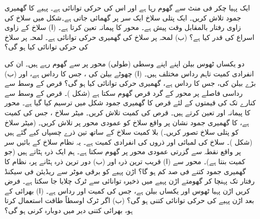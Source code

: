 ایک پہیا   چکر فی منٹ سے گھوم رہا ہے  اور اس  کی  حرکی توانائی   ہے۔ پہیے کا گھمیری جمود تلاش کریں۔
ایک پتلی سلاخ  ایک سر پر گھمائی جاتی ہے۔شکل  میں سلاخ کی   زاوی رفتار بالمقابل وقت پیش ہے۔ محور  کا پیمانہ  تعین کرتا ہے۔ (ا)  سلاخ کے  زاوی  اسراع کی قدر کیا ہے؟ (ب)  لمحہ  پر سلاخ کی گھمیری  حرکی  توانائی  ہے۔ لمحہ  پر سلاخ کی حرکی توانائی کیا ہو گی؟

دو یکساں ٹھوس  بیلن  اپنے اپنے وسطی (طولی)  محور پر     سے گھوم رہے  ہیں۔ ان کی انفرادی  کمیت    تاہم رداس مختلف ہیں۔ (ا) چھوٹے بیلن کی ، جس کا رداس  ہے، اور (ب) بڑے بیلن کی، جس کا رداس  ہے، گھمیری حرکی توانائی کیا ہو گی؟
 قرص  کے وسط سے  رداسی  فاصلے پر  محور کے گرد قرص گھوم سکتا ہے (شکل )۔  قرص کے وسط سے کنارے تک  کی قیمتوں کے لئے قرص کا گھمیری جمود   شکل  میں ترسیم کیا گیا ہے۔ محور  کا پیمانہ  اور  تعین کرتے ہیں۔ قرص کی کمیت تلاش کریں۔
میٹر سلاخ ،   جس کی کمیت  ہے، کا  گھمیری جمود   نشان پر واقع  سلاخ کو عمودی محور پر تلاش کریں۔ (میٹر سلاخ کو پتلی  سلاخ تصور کریں۔)
بلا کمیت سلاخ کے ساتھ تین ذرے چسپاں کیے گئے ہیں (شکل )۔ سلاخ کی لمبائی  اور ذروں کی انفرادی کمیت  ہے۔ یہ نظام سلاخ کے  بائیں  سر پر واقع نقطہ  سے گزرتی عمودی  محور پر گھوم سکتا ہے۔ ہم ایک ذرہ ہٹاتے ہیں (جو  کمیت بنتا ہے)۔   محور سے (ا) قریب ترین ذرہ     اور (ب) دور ترین  ذرہ ہٹانے پر، نظام کا گھمیری جمود کتنے فی صد کم ہو گا؟
اڑن پہیے کو برقی موٹر  سے   ریڈیئن فی سیکنڈ  رفتار تک پہنچا کر  گھومتے اڑن پہیے میں ذخیرہ توانائی سے ٹرک چلایا جا سکتا ہے۔ فرض کریں اڑن پہیا ٹھوس  اور  یکساں بیلن ہے، جس کی کمیت   اور رداس  ہے۔ (ا)   بھرائی کے بعد اڑن پہیے کی  حرکی توانائی    کتنی ہو گی؟ (ب)  اگر ٹرک اوسطاً  طاقت استعمال کرتا ہو،  بھرائی کتنی دیر میں دوبارہ کرنی ہو گی؟
